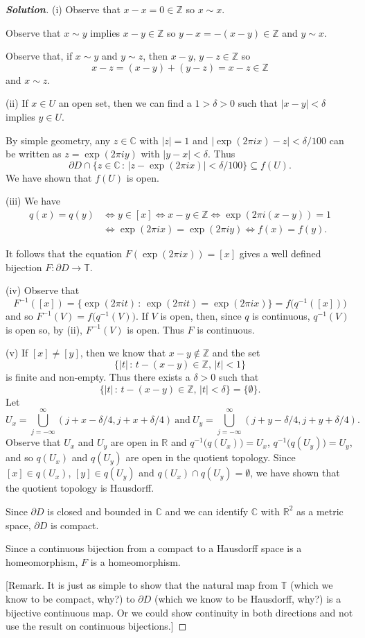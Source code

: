 \begin{proof}[\bf Solution]
(i) Observe that $x-x=0\in{\mathbb Z}$ so $x\sim x$.

Observe that $x\sim y$ implies $x-y\in{\mathbb Z}$
so $y-x=-(x-y)\in{\mathbb Z}$ and $y\sim x$.

Observe that, if  $x\sim y$ and $y\sim z$, then $x-y,\,y-z\in{\mathbb Z}$
so
\[x-z=(x-y)+(y-z)=x-z\in{\mathbb Z}\]
and $x\sim z$.

(ii) If $x\in U$ an open set, then we can find a $1>\delta>0$
such that $|x-y|<\delta$ implies $y\in U$.

By simple geometry, any $z\in{\mathbb C}$ with $|z|=1$ and
$|\exp(2\pi ix)-z|<\delta/100$
can be written as $z=\exp(2\pi iy)$ with $|y-x|<\delta$.
Thus
\[\partial D\cap\{z\in{\mathbb C}\,:\,|z-\exp(2\pi ix)|<\delta/100\}
\subseteq f(U).\]
We have shown that $f(U)$ is open.

(iii) We have
\begin{align*}
q(x)=q(y)&\Leftrightarrow y\in[x] \Leftrightarrow
x-y\in{\mathbb Z} \Leftrightarrow
\exp(2\pi i(x-y))=1\\
&\Leftrightarrow \exp(2\pi ix)=\exp(2\pi iy)
\Leftrightarrow f(x)=f(y).
\end{align*}

It follows that the equation $F(\exp(2\pi ix))=[x]$ gives a well
defined bijection $F:{\partial}D\rightarrow{\mathbb T}$.

(iv) Observe that
\[F^{-1}([x])=\{\exp(2\pi it)\,:\,\exp(2\pi it)=\exp(2\pi ix)\}
=f\big(q^{-1}([x])\big)\]
and so $F^{-1}(V)=f\big(q^{-1}(V)\big)$. If $V$ is open,
then, since $q$ is continuous, $q^{-1}(V)$ is open so, by (ii),
$F^{-1}(V)$ is open. Thus $F$ is continuous.

(v) If $[x]\neq [y]$, then we know that $x-y\notin{\mathbb Z}$
and the set
\[\{|t|\,:\,t-(x-y)\in{\mathbb Z},\,|t|<1\}\]
is finite and non-empty. Thus there exists a $\delta>0$
such that
\[\{|t|\,:\,t-(x-y)\in{\mathbb Z},\,|t|<\delta\}=\{\emptyset\}.\]
Let
\[U_{x}=\bigcup_{j=-\infty}^{\infty}(j+x-\delta/4,j+x+\delta/4)
\ \text{and}
\ U_{y}=\bigcup_{j=-\infty}^{\infty}(j+y-\delta/4,j+y+\delta/4).\]
Observe that $U_{x}$ and $U_{y}$ are open in ${\mathbb R}$
and $q^{-1}\big(q(U_{x}))=U_{x}$, $q^{-1}\big(q(U_{y}))=U_{y}$,
and so $q(U_{x})$ and $q(U_{y})$ are open in the quotient topology.
Since $[x]\in q(U_{x})$, $[y]\in q(U_{y})$
and $q(U_{x})\cap q(U_{y})=\emptyset$,
we have shown that the quotient topology is Hausdorff.

Since ${\partial}D$ is closed and bounded in ${\mathbb C}$
and we can identify ${\mathbb C}$ with ${\mathbb R}^{2}$ as a metric
space, ${\partial}D$ is compact.

Since a continuous bijection from a compact to a Hausdorff space
is a homeomorphism, $F$ is a homeomorphism.

[Remark. It is just as simple to show that the natural
map from ${\mathbb T}$ (which we know to be compact, why?)
to ${\partial}D$ (which we know to be Hausdorff, why?)
is a bijective continuous map. Or we could show continuity
in both directions and not use the result on continuous bijections.]
\end{proof}
